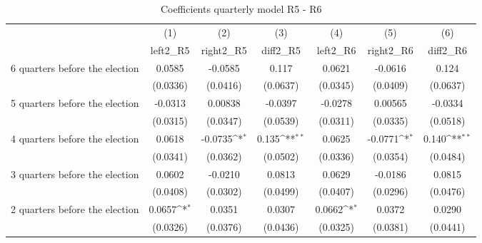 \begin{table}[!ht]\centering \footnotesize
\def\sym#1{\ifmmode^{#1}\else\(^{#1}\)\fi}
\caption{Coefficients quarterly model R5 - R6}
\begin{tabular}{l*{6}{c}}
\hline\hline
                    &\multicolumn{1}{c}{(1)}&\multicolumn{1}{c}{(2)}&\multicolumn{1}{c}{(3)}&\multicolumn{1}{c}{(4)}&\multicolumn{1}{c}{(5)}&\multicolumn{1}{c}{(6)}\\
                    &\multicolumn{1}{c}{left2\_R5}&\multicolumn{1}{c}{right2\_R5}&\multicolumn{1}{c}{diff2\_R5}&\multicolumn{1}{c}{left2\_R6}&\multicolumn{1}{c}{right2\_R6}&\multicolumn{1}{c}{diff2\_R6}\\
\hline
 6 quarters before the election&      0.0585         &     -0.0585         &       0.117         &      0.0621         &     -0.0616         &       0.124         \\
                    &    (0.0336)         &    (0.0416)         &    (0.0637)         &    (0.0345)         &    (0.0409)         &    (0.0637)         \\
[1em]
 5 quarters before the election&     -0.0313         &     0.00838         &     -0.0397         &     -0.0278         &     0.00565         &     -0.0334         \\
                    &    (0.0315)         &    (0.0347)         &    (0.0539)         &    (0.0311)         &    (0.0335)         &    (0.0518)         \\
[1em]
 4 quarters before the election&      0.0618         &     -0.0735\sym{*}  &       0.135\sym{**} &      0.0625         &     -0.0771\sym{*}  &       0.140\sym{**} \\
                    &    (0.0341)         &    (0.0362)         &    (0.0502)         &    (0.0336)         &    (0.0354)         &    (0.0484)         \\
[1em]
 3 quarters before the election&      0.0602         &     -0.0210         &      0.0813         &      0.0629         &     -0.0186         &      0.0815         \\
                    &    (0.0408)         &    (0.0302)         &    (0.0499)         &    (0.0407)         &    (0.0296)         &    (0.0476)         \\
[1em]
 2 quarters before the election&      0.0657\sym{*}  &      0.0351         &      0.0307         &      0.0662\sym{*}  &      0.0372         &      0.0290         \\
                    &    (0.0326)         &    (0.0376)         &    (0.0436)         &    (0.0325)         &    (0.0381)         &    (0.0441)         \\

\end{tabular}
\end{table}
